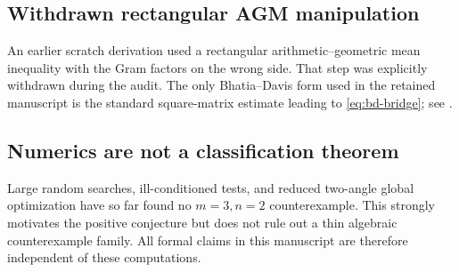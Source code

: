 \subsection{Withdrawn rectangular AGM manipulation}
\statusF{} An earlier scratch derivation used a rectangular arithmetic--geometric mean inequality with the Gram factors on the wrong side.  That step was explicitly withdrawn during the audit.  The only Bhatia--Davis form used in the retained manuscript is the standard square-matrix estimate leading to \eqref{eq:bd-bridge}; see \cite{BhatiaDavis1993}.

\subsection{Numerics are not a classification theorem}
\statusN{} Large random searches, ill-conditioned tests, and reduced two-angle global optimization have so far found no $m=3,n=2$ counterexample.  This strongly motivates the positive conjecture but does not rule out a thin algebraic counterexample family.  All formal claims in this manuscript are therefore independent of these computations.
